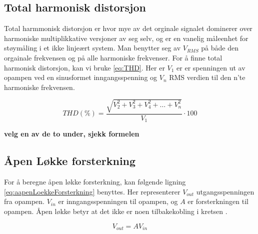 \subsection{Total harmonisk distorsjon}
\label{totalHarmoniskDistorsjon}

Total harmmonisk distorsjon er hvor mye av det orginale signalet dominerer over harmoniske multiplikkative versjoner av seg selv, og er en vanelig måleenhet for støymåling i et ikke linjeært system. Man benytter seg av $V_{RMS}$ på både den orgainale frekvensen og på alle harmoniske frekvenser. For å finne total harmonisk distorsjon, kan vi bruke \autoref{eq:THD}. Her er $V_{1}$ er er spenningen ut av opampen ved en sinusformet inngangsspenning og $V_n$ RMS verdien til den n'te harmoniske frekvensen.

\begin{equation}
    THD(\%) = \frac {\sqrt {V_2^2 + V_3^2 +V_4^2 + \ldots + V_n^2}}{V_1} \cdot 100
    \label{eq:THD}
\end{equation}



\textbf{velg en av de to under, sjekk formelen}


\subsection{Åpen Løkke forsterkning}
\label{aapenLoekkeForsterkning}

For å beregne åpen løkke forsterkning, kan følgende ligning \autoref{eq:aapenLoekkeForsterkning} benyttes. Her representerer $V_{out}$ utgangsspenningen fra opampen. $V_{in}$ er inngangsspenningen til opampen, og $A$ er forsterkningen til opampen. Åpen løkke betyr at det ikke er noen tilbakekobling i kretsen \cite{Eletronics}.

\begin{equation}
    V_{out} = AV_{in}
    \label{eq:aapenLoekkeForsterkning}
\end{equation}


